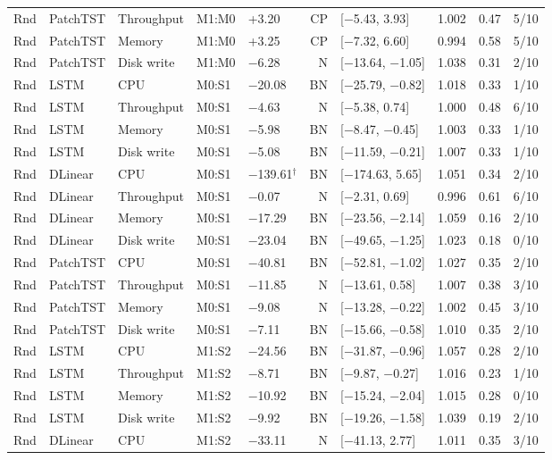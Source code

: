 \begin{longtable}{@{}lllllrlrrr@{}}
Rnd & PatchTST & Throughput & M1:M0 & +3.20 & CP & [$-$5.43, 3.93] & 1.002 & 0.47 & 5/10 \\
Rnd & PatchTST & Memory & M1:M0 & +3.25 & CP & [$-$7.32, 6.60] & 0.994 & 0.58 & 5/10 \\
Rnd & PatchTST & Disk write & M1:M0 & $-$6.28 & N & [$-$13.64, $-$1.05] & 1.038 & 0.31 & 2/10 \\
Rnd & LSTM & CPU & M0:S1 & $-$20.08 & BN & [$-$25.79, $-$0.82] & 1.018 & 0.33 & 1/10 \\
Rnd & LSTM & Throughput & M0:S1 & $-$4.63 & N & [$-$5.38, 0.74] & 1.000 & 0.48 & 6/10 \\
Rnd & LSTM & Memory & M0:S1 & $-$5.98 & BN & [$-$8.47, $-$0.45] & 1.003 & 0.33 & 1/10 \\
Rnd & LSTM & Disk write & M0:S1 & $-$5.08 & BN & [$-$11.59, $-$0.21] & 1.007 & 0.33 & 1/10 \\
Rnd & DLinear & CPU & M0:S1 & $-$139.61$^{\dagger}$ & BN & [$-$174.63, 5.65] & 1.051 & 0.34 & 2/10 \\
Rnd & DLinear & Throughput & M0:S1 & $-$0.07 & N & [$-$2.31, 0.69] & 0.996 & 0.61 & 6/10 \\
Rnd & DLinear & Memory & M0:S1 & $-$17.29 & BN & [$-$23.56, $-$2.14] & 1.059 & 0.16 & 2/10 \\
Rnd & DLinear & Disk write & M0:S1 & $-$23.04 & BN & [$-$49.65, $-$1.25] & 1.023 & 0.18 & 0/10 \\
Rnd & PatchTST & CPU & M0:S1 & $-$40.81 & BN & [$-$52.81, $-$1.02] & 1.027 & 0.35 & 2/10 \\
Rnd & PatchTST & Throughput & M0:S1 & $-$11.85 & N & [$-$13.61, 0.58] & 1.007 & 0.38 & 3/10 \\
Rnd & PatchTST & Memory & M0:S1 & $-$9.08 & N & [$-$13.28, $-$0.22] & 1.002 & 0.45 & 3/10 \\
Rnd & PatchTST & Disk write & M0:S1 & $-$7.11 & BN & [$-$15.66, $-$0.58] & 1.010 & 0.35 & 2/10 \\
Rnd & LSTM & CPU & M1:S2 & $-$24.56 & BN & [$-$31.87, $-$0.96] & 1.057 & 0.28 & 2/10 \\
Rnd & LSTM & Throughput & M1:S2 & $-$8.71 & BN & [$-$9.87, $-$0.27] & 1.016 & 0.23 & 1/10 \\
Rnd & LSTM & Memory & M1:S2 & $-$10.92 & BN & [$-$15.24, $-$2.04] & 1.015 & 0.28 & 0/10 \\
Rnd & LSTM & Disk write & M1:S2 & $-$9.92 & BN & [$-$19.26, $-$1.58] & 1.039 & 0.19 & 2/10 \\
Rnd & DLinear & CPU & M1:S2 & $-$33.11 & N & [$-$41.13, 2.77] & 1.011 & 0.35 & 3/10 \\

\end{longtable}
